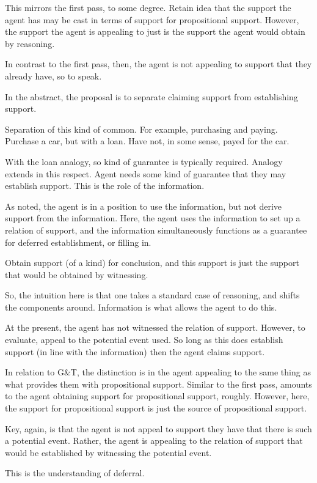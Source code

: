 \begin{note}[Intuition]
  This mirrors the first pass, to some degree.
  Retain idea that the support the agent has may be cast in terms of support for propositional support.
  However, the support the agent is appealing to just is the support the agent would obtain by reasoning.

  In contrast to the first pass, then, the agent is not appealing to support that they already have, so to speak.

  In the abstract, the proposal is to separate claiming support from establishing support.

  Separation of this kind of common.
  For example, purchasing and paying.
  Purchase a car, but with a loan.
  Have not, in some sense, payed for the car.

  With the loan analogy, so kind of guarantee is typically required.
  Analogy extends in this respect.
  Agent needs some kind of guarantee that they may establish support.
  This is the role of the information.

  As noted, the agent is in a position to use the information, but not derive support from the information.
  Here, the agent uses the information to set up a relation of support, and the information simultaneously functions as a guarantee for deferred establishment, or filling in.

  Obtain support (of a kind) for conclusion, and this support is just the support that would be obtained by witnessing.
\end{note}

\begin{note}[Deferring]
  So, the intuition here is that one takes a standard case of reasoning, and shifts the components around.
  Information is what allows the agent to do this.

  At the present, the agent has not witnessed the relation of support.
  However, to evaluate, appeal to the potential event used.
  So long as this does establish support (in line with the information) then the agent claims support.
\end{note}

\begin{note}[In relation to G\&T]
  In relation to G\&T, the distinction is in the agent appealing to the same thing as what provides them with propositional support.
  Similar to the first pass, amounts to the agent obtaining support for propositional support, roughly.
  However, here, the support for propositional support is just the source of propositional support.

  Key, again, is that the agent is not appeal to support they have that there is such a potential event.
  Rather, the agent is appealing to the relation of support that would be established by witnessing the potential event.

  This is the understanding of deferral.
\end{note}

